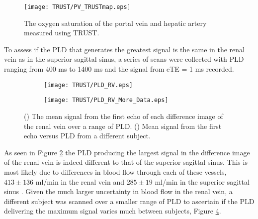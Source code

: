 \begin{figure}[h]
	\centering
	\texttt{[image: TRUST/PV\_TRUSTmap.eps]}
	\caption{The oxygen saturation of the portal vein and hepatic artery measured using \ac{TRUST}.}
	\label{fig:pv_TRUST}	
\end{figure}
To assess if the \ac{PLD} that generates the greatest signal is the same in the renal vein as in the superior sagittal sinus, a series of scans were collected with \ac{PLD} ranging from 400 ms to 1400 ms and the signal from \ac{eTE} = 1 ms recorded.\\

\begin{figure}[H]
	\centering
	\begin{subfigure}[c]{0.47\textwidth}
		\centering
		\texttt{[image: TRUST/PLD\_RV.eps]}
		\caption{}
		\label{fig:Sig_vs_PLD_RV}
	\end{subfigure}
	\hfill
	\begin{subfigure}[c]{0.47\textwidth}
		\centering
		\texttt{[image: TRUST/PLD\_RV\_More\_Data.eps]}
		\caption{}
		\label{fig:Sig_vs_PLD_RV_more}
	\end{subfigure}
	\caption{() The mean signal from the first echo of each difference image of the renal vein over a range of \ac{PLD}. () Mean signal from the first echo versus \ac{PLD} from a different subject. }
\end{figure}

As seen in Figure \ref{fig:Sig_vs_PLD_RV} the \ac{PLD} producing the largest signal in the difference image of the renal vein is indeed different to that of the superior sagittal sinus. This is most likely due to differences in blood flow through each of these vessels, $413\pm136$ ml/min in the renal vein \cite{cox_multiparametric_2017} and $285\pm19$ ml/min in the superior sagittal sinus \cite{jordan_velocity_1994}. Given the much larger uncertainty in blood flow in the renal vein, a different subject was scanned over a smaller range of \ac{PLD} to ascertain if the \ac{PLD} delivering the maximum signal varies much between subjects, Figure \ref{fig:Sig_vs_PLD_RV_more}.\\

